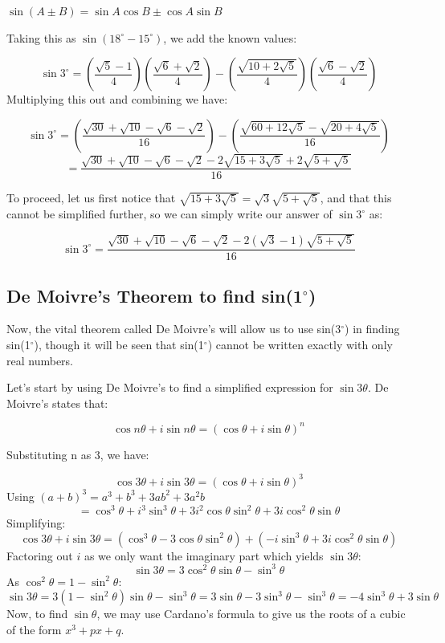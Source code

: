 \documentclass[12pt]{article}
\begin{document}
\begin{center}
$\sin(A \pm B) = \sin A \cos B \pm \cos A \sin B$
\end{center}

Taking this as $\sin(18^{\circ} - 15^{\circ})$, we add the known values:

\[
\sin{3^{\circ}} = \left(\frac{\sqrt{5}-1}{4}\right)\left(\frac{\sqrt{6}+\sqrt{2}}{4}\right) - \left(\frac{\sqrt{10+2\sqrt{5}}}{4}\right)\left(\frac{\sqrt{6}-\sqrt{2}}{4}\right)
\]
Multiplying this out and combining we have:

\[
\sin{3^{\circ}} = \left(\frac{\sqrt{30}+\sqrt{10}-\sqrt{6}-\sqrt{2}}{16}\right) - \left(\frac{\sqrt{60+12\sqrt{5}}-\sqrt{20+4\sqrt{5}}}{16}\right)
\]
\[
 = \frac{\sqrt{30}+\sqrt{10}-\sqrt{6}-\sqrt{2}-2\sqrt{15+3\sqrt{5}}+2\sqrt{5+\sqrt{5}}}{16}
\]

To proceed, let us first notice that $\sqrt{15+3\sqrt{5}} = \sqrt{3}\sqrt{5+\sqrt{5}}$, and that this cannot be simplified further, so we can simply write our answer of $\sin{3^{\circ}}$ as:

\[
\sin{3^{\circ}} =  \frac{\sqrt{30}+\sqrt{10}-\sqrt{6}-\sqrt{2}-2(\sqrt{3}-1)\sqrt{5+\sqrt{5}}}{16}
\]

\subsection{De Moivre's Theorem to find sin(1$^{\circ}$)}
Now, the vital theorem called De Moivre's will allow us to use sin(3$^{\circ}$) in finding sin(1$^{\circ}$), though it will be seen that sin(1$^{\circ}$) cannot be written exactly with only real numbers.

Let's start by using De Moivre's to find a simplified expression for $\sin3\theta$. De Moivre's states that:

\[
\cos{n\theta} + i\sin{n\theta} = (\cos{\theta} + i\sin{\theta})^n
\]

Substituting n as 3, we have:

\[
\cos{3\theta} + i\sin{3\theta} = (\cos{\theta} + i\sin{\theta})^3
\]
Using $(a+b)^3=a^3+b^3+3ab^2+3a^2b$
\[
 = \cos^3{\theta} + i^3\sin^3{\theta} +3i^2\cos{\theta}\sin^2{\theta}+3i\cos^2{\theta}\sin{\theta}
\]
Simplifying:
\[
\cos{3\theta} + i\sin{3\theta} = (\cos^3{\theta} -3\cos{\theta}\sin^2{\theta}) + (- i\sin^3{\theta} + 3i\cos^2{\theta}\sin{\theta})
\]
Factoring out $i$ as we only want the imaginary part which yields $\sin{3\theta}$:
\[
\sin{3\theta} = 3\cos^2{\theta}\sin{\theta} - \sin^3{\theta}
\]
As $\cos^2{\theta} =1-\sin^2{\theta}$:
\[
\sin{3\theta} = 3(1-\sin^2{\theta})\sin{\theta} - \sin^3{\theta} = 3\sin{\theta}-3\sin^3{\theta}-\sin^3{\theta}=-4\sin^3{\theta}+3\sin{\theta}
\]
Now, to find $\sin{\theta}$, we may use Cardano's formula to give us the roots of a cubic of the form $x^3+px+q$.
\end{document}
